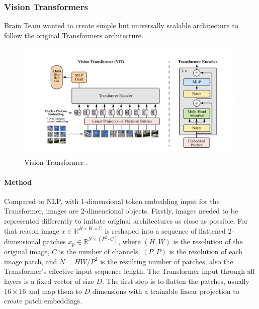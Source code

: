 \documentclass[
]{krantz}
\begin{document}
\hypertarget{vision-transformers}{%
\subsubsection{Vision Transformers}\label{vision-transformers}}

Brain Team wanted to create simple but universally scalable architecture to follow the original Transformers architecture.

\begin{figure}

{\centering \includegraphics[width=0.9\linewidth]{./figures/01-chapter1/ViT} 

}

\caption{Vision Transformer \citep{vit}.}\label{fig:ch01-figure7}
\end{figure}



\hypertarget{method}{%
\paragraph{Method}\label{method}}

Compared to NLP, with 1-dimensional token embedding input for the Transformer, images are 2-dimensional objects. Firstly, images needed to be represented differently to imitate original architectures as close as possible. For that reason image \(x\in \mathbb{R}^{ H \times W \times C}\) is reshaped into a sequence of flattened 2-dimensional patches \(x_p\in \mathbb{R}^{ N \times \left( P^2 \cdot C \right)}\), where \(\left(H,W\right)\) is the resolution of the original image, \(C\) is the number of channels, \(\left(P,P\right)\) is the resolution of each image patch, and \(N =HW/P^2\) is the resulting number of patches, also the Transformer's effective input sequence length. The Transformer input through all layers is a fixed vector of size \(D\). The first step is to flatten the patches, usually \(16\times 16\) and map them to \(D\) dimensions with a trainable linear projection to create patch embeddings.
\end{document}
